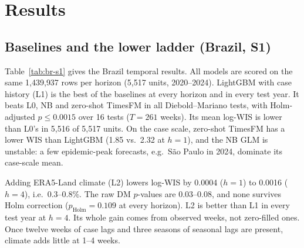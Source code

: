 \documentclass[11pt]{article}
\begin{document}
\section{Results}
\label{sec:results}

\subsection{Baselines and the lower ladder (Brazil, S1)}
Table~\ref{tab:br-s1} gives the Brazil temporal results. All models are scored on the same
1{,}439{,}937 rows per horizon (5{,}517 units, 2020--2024). LightGBM with case history (L1) is the
best of the baselines at every horizon and in every test year. It beats L0, NB and zero-shot TimesFM in all
Diebold--Mariano tests, with Holm-adjusted $p\leq 0.0015$ over 16 tests ($T=261$ weeks). Its mean
log-WIS is lower than L0's in 5{,}516 of 5{,}517 units. On the case scale, zero-shot TimesFM has a
lower WIS than LightGBM (1.85 vs.\ 2.32 at $h=1$), and the NB GLM is unstable: a few
epidemic-peak forecasts, e.g.\ S\~ao Paulo in 2024, dominate its case-scale mean.

Adding ERA5-Land climate (L2) lowers log-WIS by 0.0004 ($h=1$) to 0.0016 ($h=4$), i.e.\ 0.3--0.8\%.
The raw DM $p$-values are 0.03--0.08, and none survives Holm correction ($p_{\text{Holm}}=0.109$
at every horizon). L2 is better than L1 in every test year at $h=4$. Its whole gain comes from observed
weeks, not zero-filled ones. Once twelve weeks of case lags and three seasons of seasonal lags are
present, climate adds little at 1--4 weeks.
\end{document}
